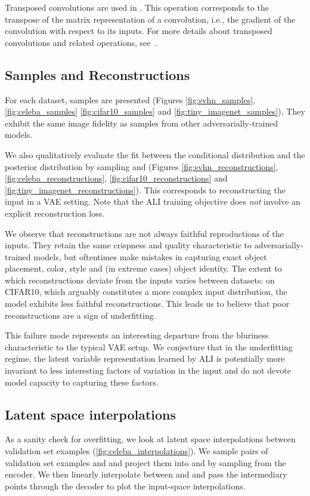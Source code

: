 \documentclass{article}
\begin{document}
Transposed convolutions are used in . This operation corresponds
to the transpose of the matrix representation of a convolution, i.e., the
gradient of the convolution with respect to its inputs. For more details about
transposed convolutions and related operations,
see~\citet{dumoulin2016guide,shi2016deconvolution,odena2016deconvolution}.

\subsection{Samples and Reconstructions}
For each dataset, samples are presented (Figures \ref{fig:svhn_samples},
\ref{fig:celeba_samples} \ref{fig:cifar10_samples} and
\ref{fig:tiny_imagenet_samples}). They exhibit the same image fidelity as
samples from other adversarially-trained models.

We also qualitatively evaluate the fit between the conditional distribution
 and the posterior distribution 
by sampling  and  (Figures \ref{fig:svhn_reconstructions},
\ref{fig:celeba_reconstructions}, \ref{fig:cifar10_reconstructions} and
\ref{fig:tiny_imagenet_reconstructions}). This corresponds to reconstructing the
input in a VAE setting. Note that the ALI training objective does {\em not}
involve an explicit reconstruction loss.

We observe that reconstructions are not always faithful reproductions of the
inputs.  They retain the same crispness and quality characteristic to
adversarially-trained models, but oftentimes make mistakes in capturing exact
object placement, color, style and (in extreme cases) object identity. The
extent to which reconstructions deviate from the inputs varies between datasets:
on CIFAR10, which arguably constitutes a more complex input distribution, the
model exhibits less faithful reconstructions. This leads us to believe that poor
reconstructions are a sign of underfitting.

This failure mode represents an interesting departure from the bluriness
characteristic to the typical VAE setup. We conjecture that in the underfitting
regime, the latent variable representation learned by ALI is potentially more
invariant to less interesting factors of variation in the input and do not
devote model capacity to capturing these factors.

\subsection{Latent space interpolations}
As a sanity check for overfitting, we look at latent space interpolations
between validation set examples (\autoref{fig:celeba_interpolations}). We sample
pairs of validation set examples  and  and project
them into  and  by sampling from the encoder. We
then linearly interpolate between  and  and pass the
intermediary points through the decoder to plot the input-space interpolations.
\end{document}
